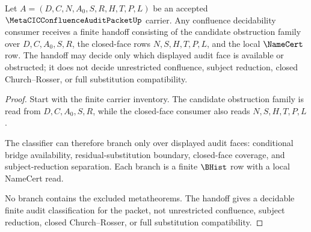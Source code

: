 \begin{theorem}
\label{thm:metacic-confluence-audit-decidability-handoff}
Let $A=(D,C,N,A_0,S,R,H,T,P,L)$ be an accepted $\MetaCICConfluenceAuditPacketUp$ carrier. Any confluence decidability consumer receives a finite handoff consisting of the candidate obstruction family over $D,C,A_0,S,R$, the closed-face rows $N,S,H,T,P,L$, and the local $\NameCert$ row. The handoff may decide only which displayed audit face is available or obstructed; it does not decide unrestricted confluence, subject reduction, closed Church--Rosser, or full substitution compatibility.
\end{theorem}
\begin{proof}
Start with the finite carrier inventory. The candidate obstruction family is read from $D,C,A_0,S,R$, while the closed-face consumer also reads $N,S,H,T,P,L$.

The classifier can therefore branch only over displayed audit faces: conditional bridge availability, residual-substitution boundary, closed-face coverage, and subject-reduction separation. Each branch is a finite $\BHist$ row with a local NameCert read.

No branch contains the excluded metatheorems. The handoff gives a decidable finite audit classification for the packet, not unrestricted confluence, subject reduction, closed Church--Rosser, or full substitution compatibility.
\end{proof}

